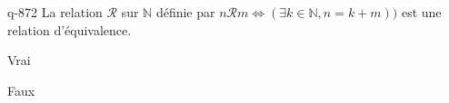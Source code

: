 \begin{truefalse}{q-872}
La relation $\mathcal R$ sur $\mathbb N$ définie par $n\mathcal R m \iff (\exists k\in\mathbb N,n=k+m))$ est une relation d'équivalence.
\item Vrai
\item* Faux
\end{truefalse}

